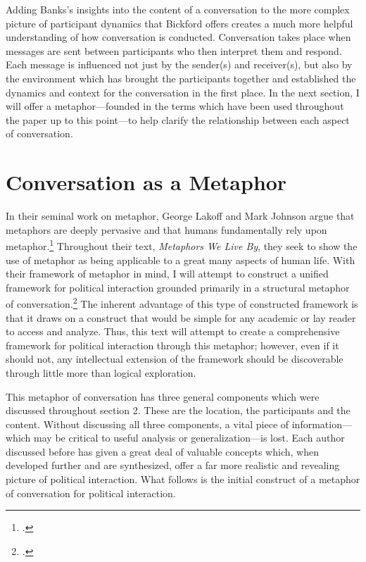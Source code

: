 \documentclass{article}
\begin{document}
Adding Banks's insights into the content of a conversation to the more complex picture of participant dynamics that Bickford offers creates a much more helpful understanding of how conversation is conducted.
Conversation takes place when messages are sent between participants who then interpret them and respond.
Each message is influenced not just by the sender(s) and receiver(s), but also by the environment which has brought the participants together and established the dynamics and context for the conversation in the first place.
In the next section, I will offer a metaphor---founded in the terms which have been used throughout the paper up to this point---to help clarify the relationship between each aspect of conversation.

\section{Conversation as a Metaphor}
In their seminal work on metaphor, George Lakoff and Mark Johnson argue that metaphors are deeply pervasive and that humans fundamentally rely upon metaphor.\footcite[3--6]{lakoffjohnson80}
Throughout their text, \emph{Metaphors We Live By}, they seek to show the use of metaphor as being applicable to a great many aspects of human life.
With their framework of metaphor in mind, I will attempt to construct a unified framework for political interaction grounded primarily in a structural metaphor of conversation.\footcite[14]{lakoffjohnson80} 
The inherent advantage of this type of constructed framework is that it draws on a construct that would be simple for any academic or lay reader to access and analyze.
Thus, this text will attempt to create a comprehensive framework for political interaction through this metaphor; however, even if it should not, any intellectual extension of the framework should be discoverable through little more than logical exploration.

This metaphor of conversation has three general components which were discussed throughout section 2.
These are the location, the participants and the content.
Without discussing all three components, a vital piece of information---which may be critical to useful analysis or generalization---is lost.
Each author discussed before has given a great deal of valuable concepts which, when developed further and are synthesized, offer a far more realistic and revealing picture of political interaction.
What follows is the initial construct of a metaphor of conversation for political interaction.
\end{document}
